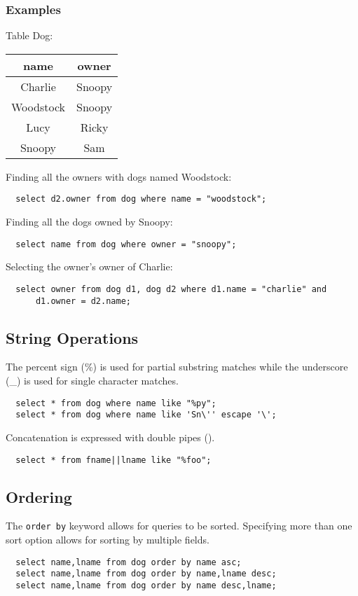 \documentclass{math}
\begin{document}
\subsubsection*{Examples}
\begin{center}
  Table Dog: \\
  \begin{tabular}{|c|c|}
    \hline
    name & owner \\
    \hline
    Charlie & Snoopy \\
    Woodstock & Snoopy \\
    Lucy & Ricky \\
    Snoopy & Sam \\
    \hline
  \end{tabular}
\end{center}
Finding all the owners with dogs named Woodstock:
\begin{lstlisting}
  select d2.owner from dog where name = "woodstock";
\end{lstlisting}
Finding all the dogs owned by Snoopy:
\begin{lstlisting}
  select name from dog where owner = "snoopy";
\end{lstlisting}
Selecting the owner's owner of Charlie:
\begin{lstlisting}
  select owner from dog d1, dog d2 where d1.name = "charlie" and
      d1.owner = d2.name;
\end{lstlisting}

\subsection*{String Operations}
The percent sign (\%) is used for partial substring matches while the
underscore (\_) is used for single character matches.
\begin{lstlisting}
  select * from dog where name like "%py";
  select * from dog where name like 'Sn\'' escape '\';
\end{lstlisting}
Concatenation is expressed with double pipes (\textbar\textbar).
\begin{lstlisting}
  select * from fname||lname like "%foo";
\end{lstlisting}

\subsection*{Ordering}
The \texttt{order by} keyword allows for queries to be sorted. Specifying more
than one sort option allows for sorting by multiple fields.
\begin{lstlisting}
  select name,lname from dog order by name asc;
  select name,lname from dog order by name,lname desc;
  select name,lname from dog order by name desc,lname;
\end{lstlisting}
\end{document}
